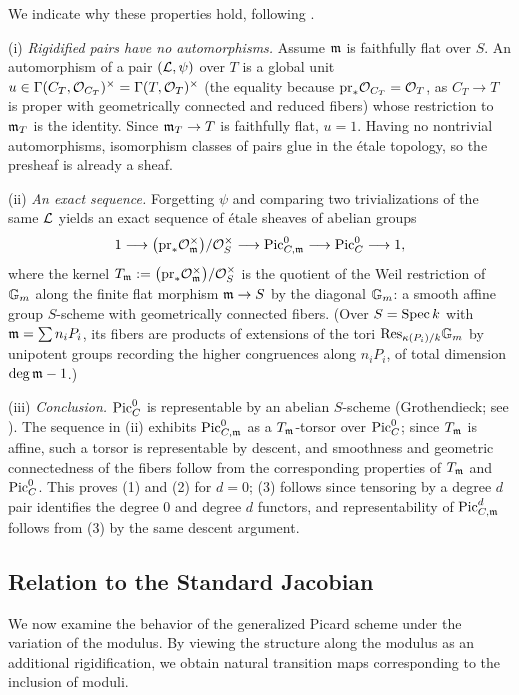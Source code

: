\begin{bluemath}
\begin{rem*}
We indicate why these properties hold, following \cite[Section 4]{Guignard2018}.

(i) \emph{Rigidified pairs have no automorphisms.} Assume $\mdls$ is
faithfully flat over $S$. An automorphism of a pair $(\cL, \psi)$ over $T$
is a global unit $u \in \Gamma(C_T, \Oo_{C_T})^\times = \Gamma(T,
\Oo_T)^\times$ (the equality because $\mathrm{pr}_* \Oo_{C_T} = \Oo_T$, as
$C_T \to T$ is proper with geometrically connected and reduced fibers)
whose restriction to $\mdls_T$ is the identity. Since $\mdls_T \to T$ is
faithfully flat, $u = 1$. Having no nontrivial automorphisms, isomorphism
classes of pairs glue in the \'etale topology, so the presheaf is already a
sheaf.

(ii) \emph{An exact sequence.} Forgetting $\psi$ and comparing two
trivializations of the same $\cL$ yields an exact sequence of \'etale
sheaves of abelian groups
\[
1 \longrightarrow
\big(\mathrm{pr}_* \Oo_{\mdls}^\times\big) / \Oo_S^\times
\longrightarrow \PicCm[0] \longrightarrow \PicC[0] \longrightarrow 1 ,
\]
where the kernel $T_\mdls := \big(\mathrm{pr}_* \Oo_{\mdls}^\times\big) /
\Oo_S^\times$ is the quotient of the Weil restriction of $\bG_m$ along the
finite flat morphism $\mdls \to S$ by the diagonal $\bG_m$: a smooth affine
group $S$-scheme with geometrically connected fibers. (Over $S = \Spec k$
with $\mdls = \sum n_i P_i$, its fibers are products of extensions of the
tori $\mathrm{Res}_{\kappa(P_i)/k}\bG_m$ by unipotent groups recording the
higher congruences along $n_i P_i$, of total dimension $\deg \mdls - 1$.)

(iii) \emph{Conclusion.} $\PicC[0]$ is representable by an abelian
$S$-scheme (Grothendieck; see \cite{milneAV}). The sequence in (ii) exhibits
$\PicCm[0]$ as a $T_\mdls$-torsor over $\PicC[0]$; since $T_\mdls$ is
affine, such a torsor is representable by descent, and smoothness and
geometric connectedness of the fibers follow from the corresponding
properties of $T_\mdls$ and $\PicC[0]$. This proves (1) and (2) for $d = 0$;
(3) follows since tensoring by a degree $d$ pair identifies the degree $0$
and degree $d$ functors, and representability of $\PicCm[d]$ follows from
(3) by the same descent argument.
\end{rem*}
\end{bluemath}

\subsection*{Relation to the Standard Jacobian}
We now examine the behavior of the generalized Picard scheme under the variation of the modulus. By viewing the structure along the modulus as an additional rigidification, we obtain natural transition maps corresponding to the inclusion of moduli.

